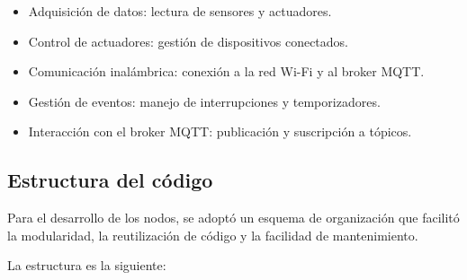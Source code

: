 \begin{itemize}
    \item Adquisición de datos: lectura de sensores y actuadores.
    \item Control de actuadores: gestión de dispositivos conectados.
    \item Comunicación inalámbrica: conexión a la red Wi-Fi y al broker MQTT.
    \item Gestión de eventos: manejo de interrupciones y temporizadores.
    \item Interacción con el broker MQTT: publicación y suscripción a tópicos.
\end{itemize}


\subsection{Estructura del código}

Para el desarrollo de los nodos, se adoptó un esquema de organización que
facilitó la modularidad, la reutilización de código y la facilidad de
mantenimiento.

La estructura es la siguiente:

